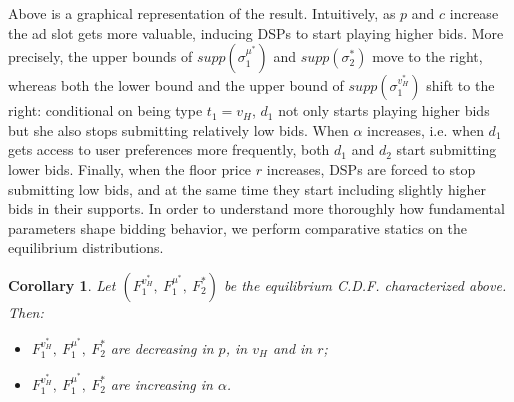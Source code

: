 \documentclass[11pt]{article}
\theoremstyle{plain}
\theoremstyle{definition}
\theoremstyle{plain}
\newtheorem{cor}[thm]{Corollary}
\theoremstyle{plain}
\theoremstyle{plain}
\theoremstyle{plain}
\numberwithin{equation}{section}
\begin{document}
\noindent Above is a graphical representation of the result. Intuitively, as $ p $ and $ c $ increase the ad slot gets more valuable, inducing DSPs to start playing higher bids. More precisely, the upper bounds of $ supp( \sigma_1^{\mu^*} ) $ and $ supp\left( \sigma_2^* \right) $ move to the right, whereas both the lower bound and the upper bound of $ supp\left( \sigma_1^{v_H^*} \right) $ shift to the right: conditional on being type $ t_1 = v_H $, $ d_1 $ not only starts playing higher bids but she also stops submitting relatively low bids. When $ \alpha $ increases, i.e. when $ d_1 $ gets access to user preferences more frequently, both $ d_1 $ and $ d_2 $ start submitting lower bids. Finally, when the floor price $ r $ increases, DSPs are forced to stop submitting low bids, and at the same time they start including slightly higher bids in their supports. In order to understand more thoroughly how fundamental parameters shape bidding behavior, we perform comparative statics on the equilibrium distributions.
\vspace{0.2cm}

\begin{cor}
Let $ \left( F_1^{v_H^*},\ F_1^{\mu^*},\ F_2^*  \right) $ be the equilibrium C.D.F. characterized above. Then:

\begin{itemize}
    \item[1.] $ F_1^{v_H^*},\ F_1^{\mu^*},\ F_2^* $ are decreasing in $ p $, in $ v_H $ and in $ r $;

    \vspace{0.1cm}

    \item[2.] $ F_1^{v_H^*},\ F_1^{\mu^*},\ F_2^* $ are increasing in $ \alpha $.
\end{itemize}

\end{cor}

\vspace{0.2cm}
\end{document}
